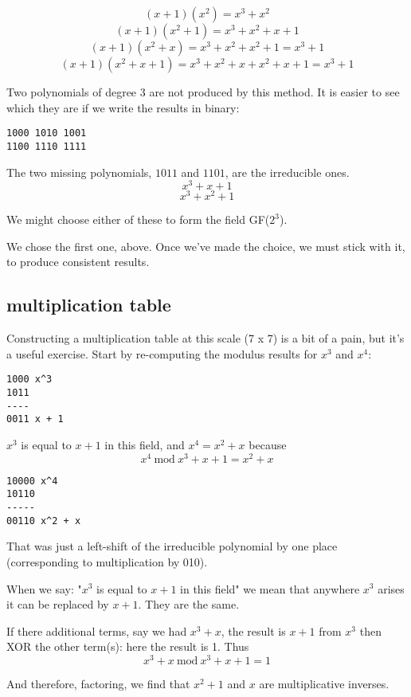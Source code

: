 \documentclass[11pt, oneside]{article}
\begin{document}
\[ (x+1)(x^2) = x^3 + x^2   \]
\[ (x+1)(x^2 + 1) =  x^3 + x^2 + x + 1 \]
\[ (x+1)(x^2 + x) = x^3 + x^2 + x^2 + 1 =  x^3 + 1 \]
\[ (x+1)(x^2 + x + 1) = x^3 + x^2 + x + x^2 + x + 1 = x^3 + 1 \]

Two polynomials of degree 3 are not produced by this method.  It is easier to see which they are if we write the results in binary:
\begin{verbatim}
1000 1010 1001
1100 1110 1111
\end{verbatim}

The two missing polynomials, $1011$ and $1101$, are the irreducible ones.
\[ x^3 + x + 1 \]
\[ x^3 + x^2 + 1 \]

We might choose either of these to form the field GF($2^3$).  

We chose the first one, above.  Once we've made the choice, we must stick with it, to produce consistent results.

\subsection*{multiplication table}
Constructing a multiplication table at this scale (7 x 7) is a bit of a pain, but it's a useful exercise.  Start by re-computing the modulus results for $x^3$ and $x^4$:

\begin{verbatim}
1000 x^3
1011
----
0011 x + 1
\end{verbatim}

$x^3$ is equal to $x + 1$ in this field, and $x^4 = x^2 + x$ because
\[ x^4 \ \text{mod} \ x^3 + x + 1 = x^2 + x \]

\begin{verbatim}
10000 x^4
10110
-----
00110 x^2 + x
\end{verbatim}

That was just a left-shift of the irreducible polynomial by one place (corresponding to multiplication by 010).

When we say:  "$x^3$ is equal to $x + 1$ in this field" we mean that anywhere $x^3$ arises it can be replaced by $x + 1$.  They are the same.

If there additional terms, say we had $x^3 + x$, the result is $x + 1$ from $x^3$ then XOR the other term(s):  here the result is 1.  Thus
\[ x^3 + x  \ \text{mod} \ x^3 + x + 1 = 1 \]

And therefore, factoring, we find that $x^2 + 1$ and $x$ are multiplicative inverses.
\end{document}
